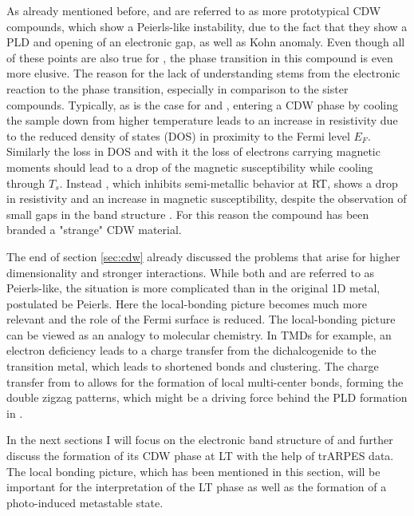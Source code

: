 As already mentioned before,  and  are referred to as more prototypical CDW compounds, which show a Peierls-like instability, due to the fact that they show a PLD and opening of an electronic gap, as well as Kohn anomaly.
Even though all of these points are also true for , the phase transition in this compound is even more elusive.
The reason for the lack of understanding stems from the electronic reaction to the phase transition, especially in comparison to the  sister compounds.
Typically, as is the case for  and , entering a CDW phase by cooling the sample down from higher temperature leads to an increase in resistivity due to the reduced density of states (DOS) in proximity to the Fermi level $E_F$.
Similarly the loss in DOS and with it the loss of electrons carrying magnetic moments should lead to a drop of the magnetic susceptibility while cooling through $T_s$.
Instead , which inhibits semi-metallic behavior at RT, shows a drop in resistivity and an increase in magnetic susceptibility, despite the observation of small gaps in the band structure \cite{sorgel_new_2006,hu_optical_2022,lin_evidence_2022}.
For this reason the compound has been branded a "strange" CDW material.

The end of section \ref{sec:cdw} already discussed the problems that arise for higher dimensionality and stronger interactions.
While both  and  are referred to as Peierls-like, the situation is more complicated than in the original 1D metal, postulated be Peierls.
Here the local-bonding picture becomes much more relevant and the role of the Fermi surface is reduced.
The local-bonding picture can be viewed as an analogy to molecular chemistry.
In TMDs for example, an electron deficiency leads to a charge transfer from the dichalcogenide to the transition metal, which leads to shortened bonds and clustering.
The charge transfer from  to  allows for the formation of local multi-center bonds, forming the double zigzag patterns, which might be a driving force behind the PLD formation in  \cite{pouget_structural_2024, whangbo_analogies_1992,canadell_importance_1992,albright_thomas_a_orbital_2013}.

In the next sections I will focus on the electronic band structure of  and further discuss the formation of its CDW phase at LT with the help of trARPES data.
The local bonding picture, which has been mentioned in this section, will be important for the interpretation of the LT phase as well as the formation of a photo-induced metastable state.

